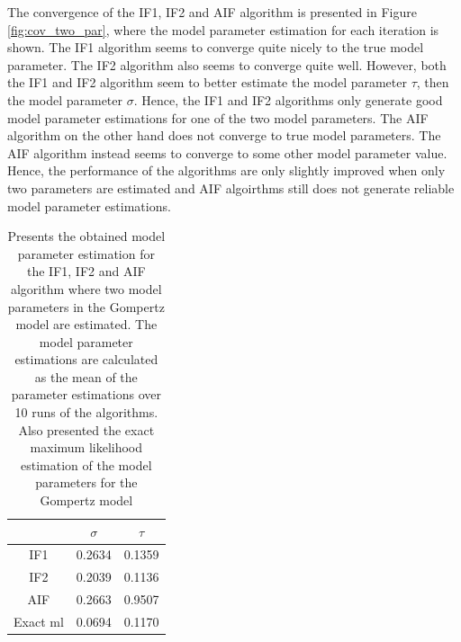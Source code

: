 \documentclass[twoside,openright]{report}
\begin{document}
The convergence of the IF1, IF2 and AIF algorithm is presented in Figure \ref{fig:cov_two_par}, where the model parameter estimation for each iteration is shown. The IF1 algorithm  seems to converge quite nicely to the true model parameter. The IF2 algorithm also seems to converge quite well. However, both the IF1 and IF2 algorithm seem to  better estimate the model parameter $\tau$, then the model parameter $\sigma$. Hence, the IF1 and IF2 algorithms only generate good model parameter estimations for one of the two model parameters.
The AIF algorithm on the other hand does not converge to true model parameters. The AIF algorithm instead seems to converge to some other model parameter value. Hence, the performance of the algorithms are only slightly improved when only two parameters are estimated and AIF algoirthms still does not generate reliable model parameter estimations.   

\begin{table}[h]
    \centering
    \caption{Presents the obtained model parameter estimation for the IF1, IF2 and AIF algorithm where two model parameters in the Gompertz model are estimated. The model parameter estimations are calculated as the mean of the parameter estimations over 10 runs of the algorithms.  Also presented the exact  maximum likelihood estimation of the model parameters for the Gompertz model \cite{king2015statistical} }
    \begin{tabular}{ c | c c }
    \toprule
        & $\sigma$ & $\tau$ \\ 
    \midrule
    IF1  & 0.2634 &   0.1359\\ 
    IF2  & 0.2039 &   0.1136 \\ 
    AIF  & 0.2663 &   0.9507 \\
    Exact ml \cite{king2015statistical}  & 0.0694 & 0.1170 \\ 
    \bottomrule
    \end{tabular}
    \label{tab:par2_Gompertz}
\end{table}
\end{document}
